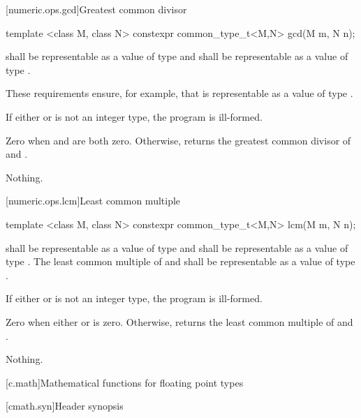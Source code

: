 [numeric.ops.gcd]{Greatest common divisor}

%
\begin{itemdecl}
template <class M, class N>
  constexpr common_type_t<M,N> gcd(M m, N n);
\end{itemdecl}

\begin{itemdescr}
\pnum
\requires
{} shall be representable as a value of type  and
 shall be representable as a value of type .
\begin{note} These requirements ensure, for example,
that  is representable as a value of type . \end{note}

\pnum
\remarks
If either  or  is not an integer type, the program is ill-formed.

\pnum
\returns
Zero when  and  are both zero.
Otherwise, returns the greatest common divisor of  and .

\pnum
\throws
Nothing.
\end{itemdescr}

[numeric.ops.lcm]{Least common multiple}

%
\begin{itemdecl}
template <class M, class N>
  constexpr common_type_t<M,N> lcm(M m, N n);
\end{itemdecl}

\begin{itemdescr}
\pnum
\requires
{} shall be representable as a value of type  and
 shall be representable as a value of type .
The least common multiple of  and 
shall be representable as a value of type .

\pnum
\remarks
If either  or  is not an integer type, the program is ill-formed.

\pnum
\returns
Zero when either  or  is zero.
Otherwise, returns the least common multiple of  and .

\pnum
\throws
Nothing.
\end{itemdescr}


[c.math]{Mathematical functions for floating point types}

[cmath.syn]{Header  synopsis}

